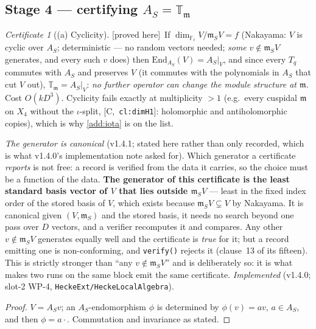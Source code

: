 \documentclass[11pt]{article}
\theoremstyle{remark}
\newtheorem{certificate}[theorem]{Certificate}
\newcommand{\F}{\mathbb{F}}
\newcommand{\End}{\mathrm{End}}
\newcommand{\Fl}{\F_\ell}
\newcommand{\T}{\mathbb{T}}
\newcommand{\m}{\mathfrak{m}}
\newcommand{\HA}[1]{[C,~\texttt{#1}]}      %
\newcommand{\PROVED}{\textsf{[proved here]}}
\begin{document}
\subsection*{Stage 4 --- certifying $A_S=\T_\m$}\label{sec:certgen}
\begin{certificate}[(a) Cyclicity]\label{cert:cyclic}\PROVED\
If $\dim_{\Fl}V/\m_SV=f$ (Nakayama: $V$ is cyclic over $A_S$; deterministic --- no random
vectors needed; \emph{some} $v\notin\m_SV$ generates, and every such $v$ does) then
$\End_{A_S}(V)=A_S|_V$, and since every
$T_q$ commutes with $A_S$ and preserves $V$ (it commutes with the polynomials in $A_S$ that cut
$V$ out), $\T_\m=A_S|_V$: \emph{no further operator can change the module structure at $\m$}.
Cost $O(kD^3)$. Cyclicity fails exactly at multiplicity $>1$ (e.g.\ every cuspidal $\m$ on
$X_4$ without the $\iota$-split, \HA{cl:dimH1}: holomorphic and antiholomorphic copies),
which is why \ref{add:iota} is on the list.

\emph{The generator is canonical} (v1.4.1; stated here rather than only recorded, which is what
v1.4.0's implementation note asked for). Which generator a certificate \emph{reports} is not
free: a record is verified from the data it carries, so the choice must be a function of the
data. \textbf{The generator of this certificate is the least standard basis vector of $V$ that
lies outside $\m_SV$} --- least in the fixed index order of the stored basis of $V$, which
exists because $\m_SV\subsetneq V$ by Nakayama. It is canonical given $(V,\m_S)$ and the stored
basis, it needs no search beyond one pass over $D$ vectors, and a verifier recomputes it and
compares. Any other $v\notin\m_SV$ generates equally well and the certificate is \emph{true} for
it; but a record emitting one is non-conforming, and \texttt{verify()} rejects it
(clause~13 of its fifteen). This is strictly stronger than ``any $v\notin\m_SV$'' and is
deliberately so: it is what makes two runs on the same block emit the same certificate.
\emph{Implemented} (v1.4.0; slot-2 WP-4, \texttt{HeckeExt/HeckeLocalAlgebra}).
\end{certificate}
\begin{proof}
$V=A_Sv$; an $A_S$-endomorphism $\phi$ is determined by $\phi(v)=av$, $a\in A_S$, and then
$\phi=a\cdot$. Commutation and invariance as stated.
\end{proof}
\end{document}
